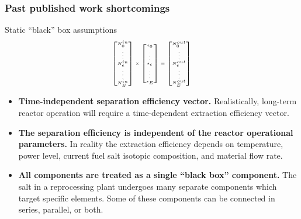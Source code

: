 \begin{frame}
\frametitle{Past published work shortcomings}
\vspace{-0.2in}
\begin{block}{Static ``black'' box assumptions}
	\begin{equation*}
	{\tiny  
		\setlength{\abovedisplayskip}{6pt}
		\setlength{\belowdisplayskip}{\abovedisplayskip}
		\setlength{\abovedisplayshortskip}{0pt}
		\setlength{\belowdisplayshortskip}{3pt}
	\begin{aligned}
	\begin{bmatrix}
	N^{in}_{0} \\ \vdots \\ N^{in}_{e} \\ \vdots \\ N^{in}_{E} \\
	\end{bmatrix} 
	\times
	\begin{bmatrix}
	\epsilon_{0} \\ \vdots \\ \epsilon_{e} \\ \vdots \\ \epsilon_{E} \\
	\end{bmatrix} =
	\begin{bmatrix}
	N^{out}_{0}\\ \vdots \\ N^{out}_{e} \\ \vdots \\N^{out}_{E}  \\
	\end{bmatrix}
	\end{aligned}
	}
	\end{equation*}
	\begin{itemize}
		\item \textbf{Time-independent separation efficiency vector.} Realistically, 
		long-term reactor operation will require a time-dependent extraction efficiency vector.
		\item \textbf{The separation efficiency is independent of the reactor operational 
		parameters.} In reality the extraction efficiency depends on temperature, 
		power level, current fuel salt isotopic composition, and material flow rate.
		\item \textbf{All components are treated as a single ``black 
		box'' component.} The salt in a reprocessing plant undergoes 
		many separate components which target specific elements. Some of these components can be connected in series, parallel, or both. 
	\end{itemize}
\end{block}
\end{frame}


